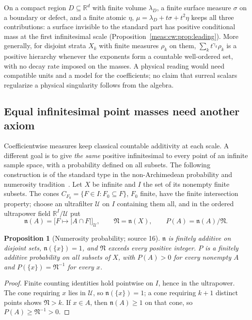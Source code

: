 \documentclass[11pt]{article}
\numberwithin{equation}{section}
\newtheorem{proposition}[theorem]{Proposition}
\theoremstyle{definition}
\theoremstyle{remark}
\newcommand{\R}{\mathbb R}
\newcommand{\abs}[1]{\lvert#1\rvert}
\begin{document}
On a compact region $D\subseteq\R^d$ with finite volume $\lambda_D$, a finite surface
measure $\sigma$ on a boundary or defect, and a finite atomic $\eta$,
$\mu=\lambda_D+t\sigma+t^2\eta$ keeps all three contributions: a surface invisible to
the standard part has positive conditional mass at the first infinitesimal scale
(Proposition~\ref{meas:cw:prop:leading}). More generally, for disjoint strata
$X_k$ with finite measures $\rho_k$ on them, $\sum_kt^{\gamma_k}\rho_k$ is a positive
hierarchy whenever the exponents form a countable well-ordered set, with no
decay rate imposed on the masses. A physical reading would need compatible units
and a model for the coefficients; no claim that surreal scalars regularize a
physical singularity follows from the algebra.

\subsection{Equal infinitesimal point masses need another axiom}
\label{meas:cw:sub:numerosity}

Coefficientwise measures keep classical countable additivity at each scale. A
different goal is to give \emph{the same} positive infinitesimal to every point
of an infinite sample space, with a probability defined on all subsets. The
following construction is of the standard type in the non-Archimedean
probability and numerosity tradition~\cite{BHW,BBDN}. Let $X$ be infinite and
$I$ the set of its nonempty finite subsets. The cones
$C_{F_0}=\{F\in I:F_0\subseteq F\}$, $F_0$ finite, have the finite intersection
property; choose an ultrafilter $\mathcal U$ on $I$ containing them all, and in the
ordered ultrapower field $\R^I/\mathcal U$ put
\begin{equation}\label{meas:cw:eq:numerosity}
 \mathfrak n(A)=\bigl[F\mapsto\abs{A\cap F}\bigr]_{\mathcal U},\qquad
 \mathfrak N=\mathfrak n(X),\qquad P(A)=\mathfrak n(A)/\mathfrak N .
\end{equation}

\begin{proposition}[Numerosity probability; source 16]
\label{meas:cw:prop:numerosity}
$\mathfrak n$ is finitely additive on disjoint sets, $\mathfrak n(\{x\})=1$, and
$\mathfrak N$ exceeds every positive integer. $P$ is a finitely additive probability
on all subsets of $X$, with $P(A)>0$ for every nonempty $A$ and
$P(\{x\})=\mathfrak N^{-1}$ for every $x$.
\end{proposition}
\begin{proof}
Finite counting identities hold pointwise on $I$, hence in the ultrapower. The
cone requiring $x$ lies in $\mathcal U$, so $\mathfrak n(\{x\})=1$; a cone requiring $k+1$
distinct points shows $\mathfrak N>k$. If $x\in A$, then $\mathfrak n(A)\ge1$ on that
cone, so $P(A)\ge\mathfrak N^{-1}>0$.
\end{proof}
\end{document}
